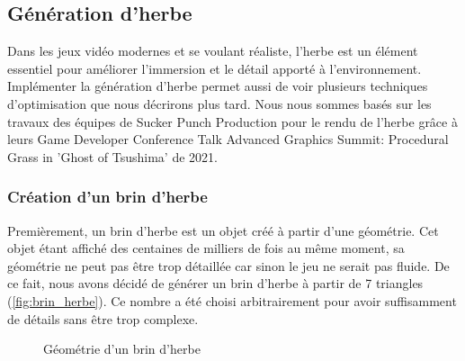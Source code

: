 \pagebreak
\subsection{Génération d'herbe}

Dans les jeux vidéo modernes et se voulant réaliste, l'herbe est un élément essentiel pour améliorer l'immersion et le détail apporté à l'environnement. Implémenter la génération d'herbe permet aussi de voir plusieurs techniques d'optimisation que nous décrirons plus tard. Nous nous sommes basés sur les travaux des équipes de Sucker Punch Production pour le rendu de l'herbe grâce à leurs Game Developer Conference Talk \og Advanced Graphics Summit: Procedural Grass in 'Ghost of Tsushima'\fg \citep{herbe} de 2021.

\subsubsection{Création d'un brin d'herbe}

Premièrement, un brin d'herbe est un objet créé à partir d'une géométrie. Cet objet étant affiché des centaines de milliers de fois au même moment, sa géométrie ne peut pas être trop détaillée car sinon le jeu ne serait pas fluide. De ce fait, nous avons décidé de générer un brin d'herbe à partir de 7 triangles (\autoref{fig:brin_herbe}). Ce nombre a été choisi arbitrairement pour avoir suffisamment de détails sans être trop complexe.
\begin{figure}[!h]
	\begin{center}
	\end{center}
	\caption{Géométrie d'un brin d'herbe}
	\label{fig:brin_herbe}
\end{figure}

